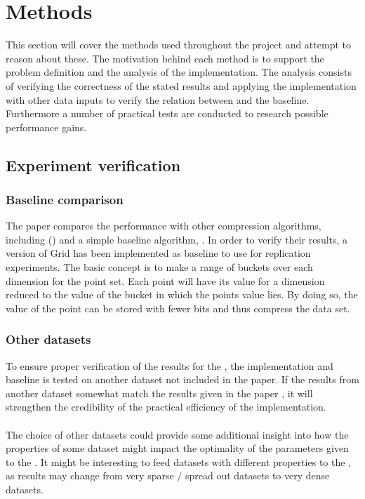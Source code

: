 \section{Methods}
\label{methods}
This section will cover the methods used throughout the project and attempt to reason about these. The motivation behind each method is to support the problem definition and the analysis of the \qs{} implementation. The analysis consists of verifying the correctness of the stated results and applying the implementation with other data inputs to verify the relation between \qs{} and the baseline. Furthermore a number of practical tests are conducted to research possible performance gains.

\subsection{Experiment verification}

\subsubsection{Baseline comparison}
The paper compares the \qs{} performance with other compression algorithms, including (\pq{}) and a simple baseline algorithm, \gr{}. In order to verify their results, a version of Grid has been implemented as baseline to use for replication experiments. The basic concept is to make a range of buckets over each dimension for the point set. Each point will have its value for a dimension reduced to the value of the bucket in which the points value lies. By doing so, the value of the point can be stored with fewer bits and thus compress the data set.

\subsubsection{Other datasets}
To ensure proper verification of the results for the \qs{}, the implementation and baseline is tested on another dataset not included in the paper. If the results from another dataset somewhat match the results given in the paper \cite{wagner17}, it will strengthen the credibility of the practical efficiency of the \qs{} implementation.
\\
\\
The choice of other datasets could provide some additional insight into how the properties of some dataset might impact the optimality of the parameters given to the \qs{}. It might be interesting to feed datasets with different properties to the \qs{}, as results may change from very sparse / spread out datasets to very dense datasets.

